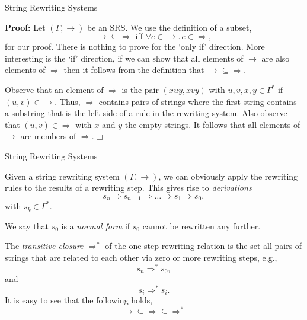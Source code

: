 \documentclass{beamer}
\begin{document}
\begin{frame}[fragile]{String Rewriting Systems}

\small

{\bf Proof:} Let $(\Gamma,\rightarrow)$ be an SRS.  We use the definition of a subset, \[\rightarrow \subseteq \Rightarrow \mbox{ iff } \forall e\in \rightarrow.\, e\in \Rightarrow,\] for our proof.
There is nothing to prove for the `only if' direction. More interesting is the `if' direction, if we can show that all elements of $\rightarrow$ are 
also elements of $\Rightarrow$ then it follows from the definition that $\rightarrow \subseteq \Rightarrow$. 

\vspace{.1in}
Observe that an element of $\Rightarrow$ is the pair $(xuy,xvy)$ with $u,v,x,y\in \Gamma^*$ if 
$(u,v)\in\rightarrow$.  Thus, $\Rightarrow$ contains pairs of strings where the first string contains a substring that is the left side
of a rule in the rewriting system.  Also observe that $(u,v)\in \Rightarrow$ with $x$ and $y$ the empty strings.  It follows that
all elements of $\rightarrow$ are members of $\Rightarrow$.$\Box$


\end{frame}

\begin{frame}[fragile]{String Rewriting Systems}

\small
Given a string rewriting system $(\Gamma,\rightarrow)$, we can obviously apply the rewriting rules to the results of a rewriting step.  This gives
rise to {\em derivations}
\[
s_n \Rightarrow s_{n-1} \Rightarrow\ldots \Rightarrow s_1 \Rightarrow s_0,
\]
with $s_k \in \Gamma^*$.

\vspace{.1in}
We say that $s_0$ is a {\em normal form} if $s_0$ cannot be rewritten any further.

\vspace{.1in}
The {\em transitive closure} $\Rightarrow^*$ of the one-step rewriting relation is the set all pairs of strings that are related
to each other via zero or more rewriting steps, e.g.,
\[
s_n \Rightarrow^* s_0,
\]
and
\[
s_i \Rightarrow^* s_i.
\]
It is easy to see that the following holds,
\[
\rightarrow \subseteq \Rightarrow \subseteq \Rightarrow^*
\]
\end{frame}
\end{document}
